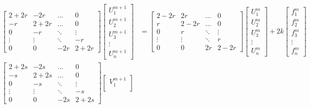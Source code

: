 \begin{align*}
\begin{bmatrix}
    2+2r   & -2r    & \dots  & 0 \\
    -r     & 2+2r   & \dots  & 0 \\
    0      & -r     & \ddots & \vdots \\
    \vdots & \vdots & \ddots & -r   \\
    0      & 0      & -2r    & 2+2r
\end{bmatrix}
\begin{bmatrix}
    U_1^{m+1} \\
    U_2^{m+1} \\
    U_3^{m+1} \\
    \vdots    \\
    U_n^{m+1}
\end{bmatrix}
&=
\begin{bmatrix}
    2-2r   & 2r     & \dots  & 0 \\
    r      & 2-2r   & \dots  & 0 \\
    0      & r      & \ddots & \vdots \\
    \vdots & \vdots & \ddots & r   \\
    0      & 0      & 2r     & 2-2r
\end{bmatrix}
\begin{bmatrix}
    U_1^{m} \\
    U_2^{m} \\
    U_3^{m} \\
    \vdots  \\
    U_n^{m}
\end{bmatrix} + 2k
\begin{bmatrix}
    f_1^{m} \\
    f_2^{m} \\
    f_3^{m} \\
    \vdots  \\
    f_n^{m}
\end{bmatrix} \\[10pt]
\begin{bmatrix}
    2+2s   & -2s    & \dots  & 0 \\
    -s     & 2+2s   & \dots  & 0 \\
    0      & -s     & \ddots & \vdots \\
    \vdots & \vdots & \ddots & -s   \\
    0      & 0      & -2s    & 2+2s
\end{bmatrix}
\begin{bmatrix}
    V_1^{m+1} \\

\end{bmatrix}
\end{align*}
